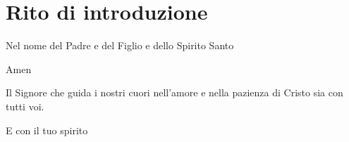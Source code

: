 
\section*{Rito di introduzione}

\begin{dialoghi}
	\item[\sacerdote] Nel nome del Padre e del Figlio e dello Spirito Santo
	\item[\tutti] Amen
	\item[\sacerdote] Il Signore che guida i nostri cuori nell'amore e nella pazienza di Cristo sia con tutti voi.
	\item[\tutti] E con il tuo spirito
\end{dialoghi}


